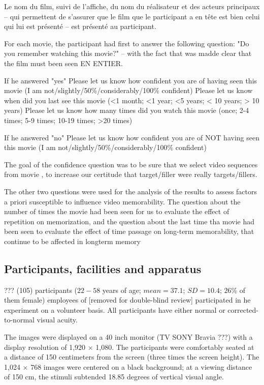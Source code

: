 \documentclass[sigconf]{acmart}
\begin{document}

Le nom du film, suivi de l’affiche, du nom du réalisateur et des acteurs principaux – qui permettent de s’assurer que le film que le participant a en tête est bien celui qui lui est présenté – est présenté au participant.

For each movie, the participant had first to answer the following question: "Do you remember watching this movie?" -- with the fact that was madde clear that the film must been seen EN ENTIER.

If he answered "yes"
Please let us know how confident you are of having seen this movie (I am not/slightly/50\%/considerably/100\% confident)
Please let us know when did you last see this movie (<1 month; <1 year; <5 years; < 10 years; > 10 years)
Please let us know how many times did you watch this movie (once; 2-4 times; 5-9 times; 10-19 times; >20 times)

If he answered "no"
Please let us know how confident you are of NOT having seen this movie (I am not/slightly/50\%/considerably/100\% confident)
 
The goal of the confidence question was to be sure that we select video sequences from movie , to increase our certitude that target/filler were really targets/fillers.

The other two questions were used for the analysis of the results to assess factors a priori susceptible to influence video memorability. The question about the number of times the movie had been seen for us to evaluate the effect of repetition on memorization, and the question about the last time tha movie had been seen to evaluate the effect of time passage on long-term memorability, that continue to be affected in longterm memory %

\subsection{Participants, facilities and apparatus}
??? (105) participants ($22-58$ years of age; $mean = 37.1 $; $SD = 10.4 $; $26\%$ of them female) employees of [removed for double-blind review] participated in he experiment on a volunteer basis. %
All participants have either normal or corrected-to-normal visual acuity.

The images were displayed on a 40 inch monitor (TV SONY Bravia ???) with a display resolution of 1,920 $\times$ 1,080. The participants were comfortably seated at a distance of 150 centimeters from the screen (three times the screen height). The 1,024 $\times$ 768 images were centered on a black background; at a viewing distance of 150 cm, the stimuli subtended 18.85 degrees of vertical visual angle.
\end{document}

